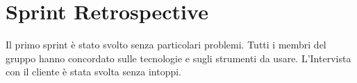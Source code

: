 \section{Sprint Retrospective}
Il primo sprint è stato svolto senza particolari problemi. Tutti i membri del gruppo hanno concordato sulle tecnologie e sugli strumenti da usare. L'Intervista con il cliente è stata svolta senza intoppi.

